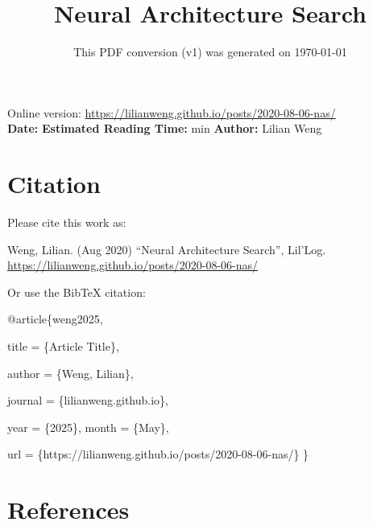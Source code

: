\documentclass[12pt]{article}
\title{Neural Architecture Search}
\date{This PDF conversion (v1) was generated on \today\footnotemark}
\begin{document}
\maketitle
\begin{center}
    Online version: \url{https://lilianweng.github.io/posts/2020-08-06-nas/} \\
    \textbf{Date:} \quad
    \textbf{Estimated Reading Time:}  min \quad
    \textbf{Author:} Lilian Weng
\end{center}




\newpage
\tableofcontents
\newpage
\vspace{1em}
\n\n\n\section{Citation}
Please cite this work as:

\begin{tcolorbox}[colback=black!5!white, colframe=black!80!white, boxrule=0.5pt, arc=2mm, left=1mm, right=1mm, top=1mm, bottom=1mm]
  Weng, Lilian. (Aug 2020) ``Neural Architecture Search'', Lil'Log. \url{https://lilianweng.github.io/posts/2020-08-06-nas/}
  \end{tcolorbox}

Or use the BibTeX citation:

\begin{tcolorbox}[
    colback=black!5!white,
    colframe=black!80!white,
    boxrule=0.5pt,
    arc=2mm,
    left=1mm,
    right=1mm,
    top=1mm,
    bottom=1mm,
    listing only,
    listing options={
      basicstyle=\ttfamily\footnotesize,
      breaklines=true,
      literate={\{}{{\char`\{}}1 {\}}{{\char`\}}}1
    }
  ]
  @article\{weng2025,

    title   = \{Article Title\},

    author  = \{Weng, Lilian\},

    journal = \{lilianweng.github.io\},

    year    = \{2025\},
    month   = \{May\},

    url     = \{https://lilianweng.github.io/posts/2020-08-06-nas/\}\n
  \}
  \end{tcolorbox}

\newpage
\section{References}

\n
\end{document}
